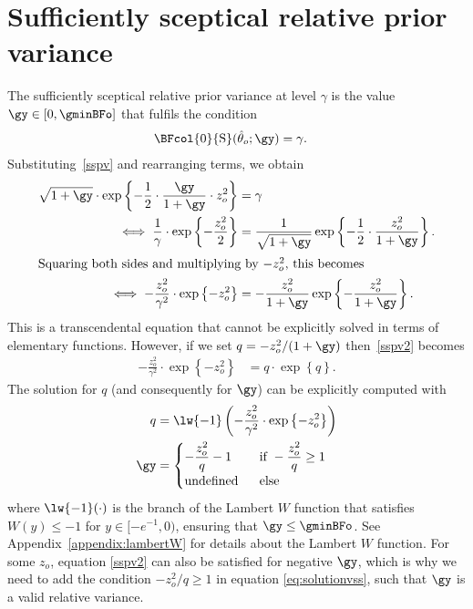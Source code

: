 \begin{subappendices}
  \label{sec:appendices}
  \renewcommand{\thesection}{\Alph{section}}

\section{Sufficiently sceptical relative prior variance}
\label{appendix:ssrv}
The sufficiently sceptical relative prior variance at level $\gamma$ is the
value $\gy \in [0, \gminBFo]$ that fulfils the condition
\begin{align}
  \label{sspv}
  \BFcol{0}{\text{S}}(\hat{\theta}_o; \gy)
  &= \gamma.
\end{align}
Substituting~\eqref{sspv} and rearranging terms, we obtain
\begin{align}
  \label{sspv2}
  \sqrt{1 + \gy} \cdot
  \exp\left\{-\frac{1}{2} \cdot
  \frac{\gy}{1 + \gy} \cdot z^2_o\right\}
  &= \gamma \nonumber \\
  \iff \frac{1}{\gamma} \cdot \exp\left\{-\frac{z_o^2}{2}\right\}
  &= \frac{1}{\sqrt{1 + \gy}} \exp\left\{-\frac{1}{2} \cdot
  \frac{z_o^2}{1 + \gy}\right\}. \nonumber
  \\
  \intertext{Squaring both sides and multiplying by $-z_o^2$, this becomes}
  \iff -\frac{z_o^2}{\gamma^2} \cdot \exp\left\{-z_o^2\right\}
  &= -\frac{z_o^2}{1 + \gy}
  \exp\left\{-\frac{z_o^2}{1 + \gy}\right\}.
\end{align}
This is a transcendental equation that cannot be explicitly solved in terms of
elementary functions. However, if we set $q = -z_o^2/(1 + \gy)$
then~\eqref{sspv2} becomes
\begin{align*}
  -\frac{z_o^2}{\gamma^2} \cdot \exp\left\{-z_o^2\right\}
  &= q \cdot \exp\left\{q\right\}.
\end{align*}
The solution for $q$ (and consequently for $\gy$) can be explicitly computed
with
\begin{align}
\label{eq:solutionvss}
  q &= \lw{-1}\left(-\frac{z_o^2}{\gamma^2} \cdot \exp\left\{-z_o^2\right\}\right)
  \nonumber \\
  \gy &=
  \begin{cases}
    -\dfrac{z_o^2}{q} - 1 & ~~ \text{if} ~ -\dfrac{z_o^2}{q} \geq 1 \\
    \text{undefined} & ~~ \text{else}
  \end{cases}
\end{align}
where $\lw{-1}(\cdot)$ is the branch of the Lambert $W$ function that satisfies
$W(y) \leq -1$ for $y \in [-e^{-1}, 0)$, ensuring that $\gy \leq \gminBFo$. See
Appendix~\ref{appendix:lambertW} for details about the Lambert $W$ function. For
some $z_o$, equation \eqref{sspv2} can also be satisfied for negative $\gy$,
which is why we need to add the condition $-z_o^2/q \geq 1$ in equation
\eqref{eq:solutionvss}, such that $\gy$ is a valid relative variance.


\end{subappendices}
